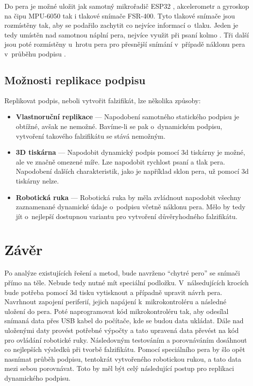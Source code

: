 Do pera je možné uložit jak samotný mikrořadič ESP32%
, akcelerometr a gyroskop na čipu MPU-6050 %
tak i tlakové snímače FSR-400.
Tyto tlakové snímače jsou rozmístěny tak, aby se podařilo zachytit co nejvíce informací o~tlaku.
Jeden je tedy umístěn nad samotnou náplní pera, nejvíce využit při psaní kolmo%
.
Tři další jsou poté rozmístěny u~hrotu pera pro přesnější snímání v~případě náklonu pera v~průběhu podpisu%
. 


\section{Možnosti replikace podpisu}
Replikovat podpis, neboli vytvořit falzifikát, lze několika způsoby:

\begin{itemize}
  \item \textbf{Vlastnoruční replikace} --- 
  Napodobení samotného statického podpisu je obtížné, avšak ne nemožné. 
  Bavíme-li se pak o~dynamickém podpisu, vytvoření takového falzifikátu se stává nemožným.

  \item \textbf{3D tiskárna} ---
  Napodobit dynamický podpis pomocí 3d tiskárny je možné, ale ve značně omezené míře.
  Lze napodobit rychlost psaní a tlak pera. 
  Napodobení dalších charakteristik, jako je například sklon pera, už pomocí 3d tiskárny nelze.

  \item \textbf{Robotická ruka} ---
  Robotická ruka by měla zvládnout napodobit všechny zaznamenané dynamické údaje o~podpisu včetně náklonu pera.
  Mělo by tedy jít o~nejlepší dostupnou variantu pro vytvoření důvěryhodného falzifikátu. 
\end{itemize}

\chapter{Závěr}
Po analýze existujících řešení a metod, bude navrženo ``chytré pero'' se snímači přímo na těle. Nebude tedy nutné mít speciální podložku.
V~nálsedujících krocích bude potřeba pomocí 3d tisku vytisknout a případně upravit návrh pera.
Navrhnout zapojení periferií, jejich napájení k~mikrokontroléru a následné uložení do pera.
Poté naprogramovat kód mikrokontroléru tak, aby odesílal snímaná data přes USB kabel do počítače, kde se budou data ukládat.
Dále nad uloženými daty provést potřebné výpočty a tato upravená data převést na kód pro ovládání robotické ruky.
Následovným testováním a porovnáváním dosáhnout co nejlepších výsledků při tvorbě falzifikátu.
Pomocí speciálního pera by šlo opět nasnímat průběh podpisu, tentokrát vytvořeného robotickou rukou, a tato data mezi sebou porovnávat.
Toto by měl být celý následující postup pro replikaci dynamického podpisu.



